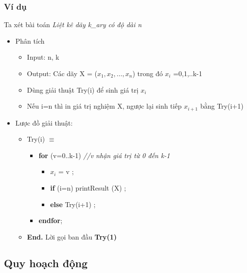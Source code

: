\subsubsection{Ví dụ}
Ta xét bài toán \textit{Liệt kê dãy k\_ary có độ dài n}
\begin{itemize}
    \item Phân tích
        \begin{itemize}
            \item Input: n, k
            \item Output: Các dãy X = ($x_1, x_2, …,x_n$) trong đó $x_i$ =0,1,..k-1
            \item Dùng giải thuật Try(i) để sinh giá trị $x_i$
            \item Nếu i=n thì in giá trị nghiệm X, ngược lại sinh tiếp $x_{i+1}$ bằng Try(i+1)
        \end{itemize}
    \item Lược đồ giải thuật:
        \begin{itemize}
            \item [] Try(i) $\equiv$
                \begin{itemize}
                    \item [] \textbf{for} (v=0..k-1) \textit{//v nhận giá trị từ 0 đến k-1}
                        \begin{itemize}
                            \item [] $x_i$ = v ;
                            \item [] \textbf{if} (i=n) printResult (X) ;
                            \item [] \textbf{else} Try(i+1) ;
                        \end{itemize}
                    \item [] \textbf{endfor};
                \end{itemize}
            \item [] \enskip \textbf{End.} \hfill Lời gọi ban đầu \textbf{Try(1)}
        \end{itemize}
\end{itemize}

\subsection{Quy hoạch động}


